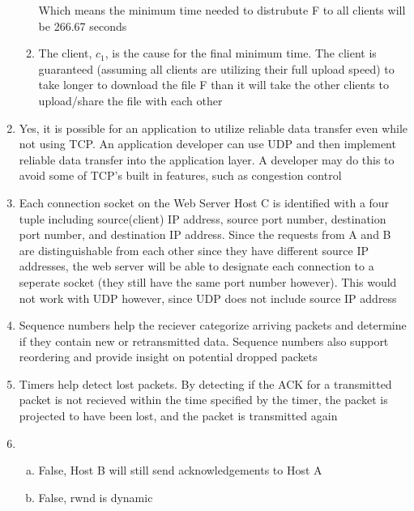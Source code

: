 \documentclass[14pt]{article}
\begin{document}
\begin{enumerate}
\begin{enumerate}[(1)]
Which means the minimum time needed to distrubute F to all clients will be 266.67 seconds \\

\item
The client, $c_1$, is the cause for the final minimum time. The client is guaranteed (assuming all clients are utilizing their full upload speed) to take longer to download the file F than it will take the other clients to upload/share the file with each other \\
\end{enumerate}

\item
Yes, it is possible for an application to utilize reliable data transfer even while not using TCP. An application developer can use UDP and then implement reliable data transfer into the application layer. A developer may do this to avoid some of TCP's built in features, such as congestion control \\

\item
Each connection socket on the Web Server Host C is identified with a four tuple including source(client) IP address, source port number, destination port number, and destination IP address. Since the requests from A and B are distinguishable from each other since they have different source IP addresses, the web server will be able to designate each connection to a seperate socket (they still have the same port number however). This would not work with UDP however, since UDP does not include source IP address

\item
Sequence numbers help the reciever categorize arriving packets and determine if they contain new or retransmitted data. Sequence numbers also support reordering and provide insight on potential dropped packets \\

\item
Timers help detect lost packets. By detecting if the ACK for a transmitted packet is not recieved within the time specified by the timer, the packet is projected to have been lost, and the packet is transmitted again \\

\item
\begin{enumerate}[(a)]
\item
False, Host B will still send acknowledgements to Host A

\item
False, rwnd is dynamic


\end{enumerate}
\end{enumerate}
\end{document}
